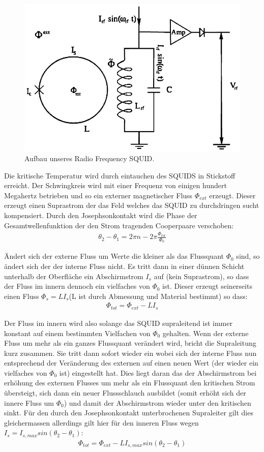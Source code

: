 \documentclass[12pt]{article}
\begin{document}
\begin{figure}[H]
\centering
\includegraphics[width=0.9\linewidth]{pictures/rfSQUID.eps}
\caption{Aufbau unseres Radio Frequency SQUID.}
\end{figure}

Die  kritische Temperatur wird durch eintauchen des SQUIDS in Stickstoff erreicht. Der Schwingkreis wird mit einer Frequenz von einigen hundert Megahertz betrieben und so ein externer magnetischer Fluss $\Phi_{ext}$ erzeugt. Dieser erzeugt einen Suprastrom der das Feld welches das SQUID zu durchdringen sucht kompensiert. Durch den Josephsonkontakt wird die Phase der Gesamtwellenfunktion der den Strom tragenden Cooperpaare verschoben:
\begin{align}
 \theta_2-\theta_1=2\pi n - 2 \pi \frac{\Phi_{tot}}{\Phi_0}
\end{align}

Ändert sich der externe Fluss um Werte die kleiner als das Flussquant $\Phi_0$ sind,  so ändert sich der der interne Fluss nicht. Es tritt dann in einer dünnen Schicht unterhalb der Oberfläche ein Abschirmstrom $I_s$ auf (kein Suprastrom), so
dass der Fluss im innern dennoch ein vielfaches von  $\Phi_0$ ist. Dieser erzeugt seinerseits einen Fluss $\Phi_s=L I_s$(L ist durch Abmessung und Material bestimmt) so dass:
\begin{align}
 \Phi_{tot}=\Phi_{ext}-L I_s
\end{align}

Der Fluss im innern wird also solange das SQUID supraleitend ist immer konstant auf einem bestimmten Vielfachen von $\Phi_0$ gehalten. Wenn der externe Fluss um mehr als ein ganzes Flussquant verändert wird, bricht die Supraleitung kurz zusammen. Sie tritt dann sofort wieder ein wobei sich der interne Fluss nun entsprechend der Veränderung des externen auf einen neuen Wert (der wieder ein vielfaches von  $\Phi_0$ ist) eingestellt hat. Dies liegt  daran das der Abschirmstrom bei erhöhung des externen Flusses um mehr als ein Flussquant den kritischen Strom übersteigt, sich dann ein neuer Flussschlauch ausbildet (somit erhöht sich der innere Fluss um $\Phi_0$) und damit der Abschirmstrom wieder unter den kritischen sinkt.
Für den durch den Josephsonkontakt unterbrochenen Supraleiter gilt dies gleichermassen allerdings gilt hier für den inneren Fluss wegen $I_s=I_{s,max} sin(\theta_2-\theta_1)$:
\begin{align}
 \Phi_{tot}=\Phi_{ext}-L I_{s,max} sin(\theta_2-\theta_1)
\end{align}
\end{document}
